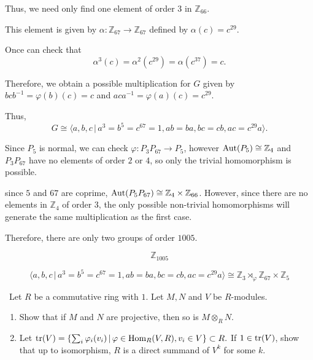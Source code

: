 \documentclass[12pt]{Qual}
\begin{document}
\begin{solution}
Thus, we need only find one element of order $3$ in $\mathbb{Z}_{66}.$

This element is given by $\alpha:\mathbb{Z}_{67}\to\mathbb{Z}_{67}$ defined by $\alpha(c)=c^{29}$.

Once can check that $$\alpha^3(c)=\alpha^2(c^{29})=\alpha(c^{37})=c.$$

Therefore, we obtain a possible multiplication for $G$ given by $bcb^{-1}=\varphi(b)(c)=c$ and $aca^{-1}=\varphi(a)(c)=c^{29}.$

Thus, $$G\cong\langle a,b,c\,|\, a^3=b^5=c^{67}=1,ab=ba,bc=cb,ac=c^{29}a\rangle.$$

 Since $P_5$ is normal, we can check $\varphi:P_3P_{67}\to P_5$, however $\text{Aut}(P_5)\cong\mathbb{Z}_4$ and $P_3P_{67}$ have no elements of order $2$ or $4$, so only the trivial homomorphism is possible.

 since $5$ and $67$ are coprime, $\text{Aut}(P_5P_{67})\cong\mathbb{Z}_4\times\mathbb{Z}_{66}$. However, since there are no elements in $\mathbb{Z}_4$ of order $3$, the only possible non-trivial homomorphisms will generate the same multiplication as the first case.

Therefore, there are only two groups of order $1005$.
\begin{center}
\begin{framed}
$$\mathbb{Z}_{1005}$$

$$\langle a,b,c\,|\, a^3=b^5=c^{67}=1,ab=ba,bc=cb,ac=c^{29}a\rangle\cong\mathbb{Z}_3\rtimes_\varphi\mathbb{Z}_{67}\times\mathbb{Z}_5$$
\end{framed}
\end{center}
\end{solution}
\newpage


\begin{problem} $\,$
Let $R$ be a commutative ring with $1$. Let $M,N$ and $V$ be $R$-modules.
\begin{enumerate}[label=(\alph*)]
    \item Show that if $M$ and $N$ are projective, then so is $M\otimes_RN$.
    \item Let $\text{tr}(V)=\{\sum_i\varphi_i(v_i)\,|\,\varphi\in\text{Hom}_R(V,R),v_i\in V\}\subset R.$ If $1\in\text{tr}(V)$, show that up to isomorphism, $R$ is a direct summand of $V^k$ for some $k.$
\end{enumerate}
\end{problem}
\end{document}
